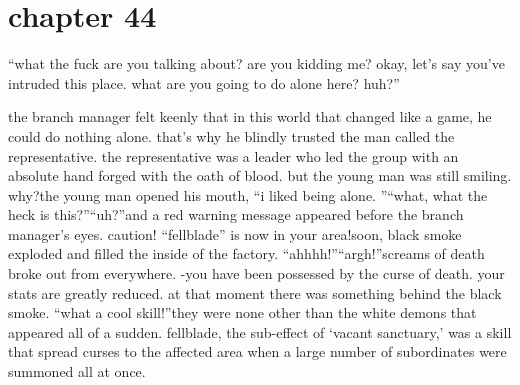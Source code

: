 \section{chapter 44}

                            “what the fuck are you talking about? are you kidding me? okay, let’s say you’ve intruded this place.
 what are you going to do alone here? huh?”




the branch manager felt keenly that in this world that changed like a game, he could do nothing alone.
 that’s why he blindly trusted the man called the representative.
 the representative was a leader who led the group with an absolute hand forged with the oath of blood.
but the young man was still smiling.
 why?the young man opened his mouth, “i liked being alone.
”“what, what the heck is this?”“uh?”and a red warning message appeared before the branch manager’s eyes.
caution! “fellblade” is now in your area!soon, black smoke exploded and filled the inside of the factory.
“ahhhh!”“argh!”screams of death broke out from everywhere.
-you have been possessed by the curse of death.
 your stats are greatly reduced.
at that moment there was something behind the black smoke.
“what a cool skill!”they were none other than the white demons that appeared all of a sudden.
fellblade, the sub-effect of ‘vacant sanctuary,’ was a skill that spread curses to the affected area when a large number of subordinates were summoned all at once.

